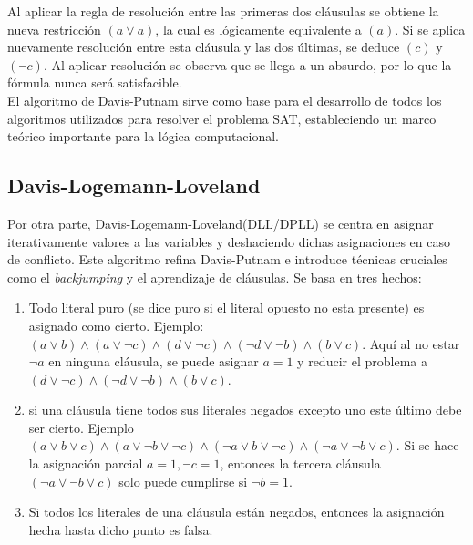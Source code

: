 \documentclass[12pt]{report}
\begin{document}
Al aplicar la regla de resolución entre las primeras dos cláusulas se obtiene la nueva restricción $(a \lor  a)$, la cual es lógicamente equivalente a $(a)$. Si se aplica nuevamente resolución entre esta cláusula y las dos últimas, se deduce $(c)$ y $(\neg c)$. Al aplicar resolución se observa que se llega a un absurdo, por lo que la fórmula nunca será satisfacible. \\

El algoritmo de Davis-Putnam sirve como base para el desarrollo de todos los algoritmos utilizados para resolver el problema SAT, estableciendo un marco teórico importante para la lógica computacional.


\subsection{Davis-Logemann-Loveland}

Por otra parte, Davis-Logemann-Loveland(DLL/DPLL) se centra en asignar iterativamente valores a las variables y deshaciendo dichas asignaciones en caso de conflicto. Este algoritmo refina Davis-Putnam e introduce técnicas cruciales como el \textit{backjumping} y el aprendizaje de cláusulas. Se basa en tres hechos: 
\begin{enumerate}
    \item Todo literal puro (se dice puro si el literal opuesto no esta presente) es asignado como cierto. Ejemplo: $(a\lor  b) \land (a\lor  \neg c) \land (d\lor  \neg c) \land (\neg d\lor  \neg b) \land (b\lor  c) $. Aquí al no estar $\neg a$ en ninguna cláusula, se puede asignar $a=1$ y reducir el problema a $(d\lor  \neg c) \land (\neg d\lor  \neg b) \land (b\lor  c) $.
    \item si una cláusula tiene todos sus literales negados excepto uno este último debe ser cierto. Ejemplo $(a \lor  b \lor  c)\land(a\lor \neg b\lor \neg c)\land(\neg a\lor  b\lor \neg c) \land(\neg a\lor  \neg b\lor  c).$ Si se hace la asignación parcial $a=1, \neg c=1$, entonces la tercera cláusula $(\neg a\lor  \neg b\lor  c)$ solo puede cumplirse si $\neg b=1$.
    \item Si todos los literales de una cláusula están negados, entonces la asignación hecha hasta dicho punto es falsa.\\
\end{enumerate}
\end{document}
